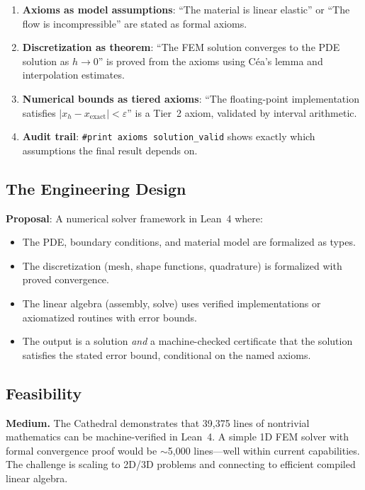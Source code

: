 \documentclass[11pt,a4paper]{article}
\begin{document}
\begin{enumerate}
  \item \textbf{Axioms as model assumptions}: ``The material is
    linear elastic'' or ``The flow is incompressible'' are stated
    as formal axioms.
  \item \textbf{Discretization as theorem}: ``The FEM solution
    converges to the PDE solution as $h \to 0$'' is proved from
    the axioms using C\'ea's lemma and interpolation estimates.
  \item \textbf{Numerical bounds as tiered axioms}: ``The
    floating-point implementation satisfies $|x_h - x_{\text{exact}}|
    < \varepsilon$'' is a Tier~2 axiom, validated by interval
    arithmetic.
  \item \textbf{Audit trail}: \texttt{\#print axioms solution\_valid}
    shows exactly which assumptions the final result depends on.
\end{enumerate}

\subsection{The Engineering Design}

\textbf{Proposal}: A numerical solver framework in Lean~4 where:
\begin{itemize}
  \item The PDE, boundary conditions, and material model are
    formalized as types.
  \item The discretization (mesh, shape functions, quadrature) is
    formalized with proved convergence.
  \item The linear algebra (assembly, solve) uses verified
    implementations or axiomatized routines with error bounds.
  \item The output is a solution \emph{and} a machine-checked
    certificate that the solution satisfies the stated error bound,
    conditional on the named axioms.
\end{itemize}

\subsection{Feasibility}

\textbf{Medium.} The Cathedral demonstrates that 39,375 lines of
nontrivial mathematics can be machine-verified in Lean~4. A simple
1D FEM solver with formal convergence proof would be $\sim$5,000
lines---well within current capabilities. The challenge is scaling
to 2D/3D problems and connecting to efficient compiled linear
algebra.
\end{document}
